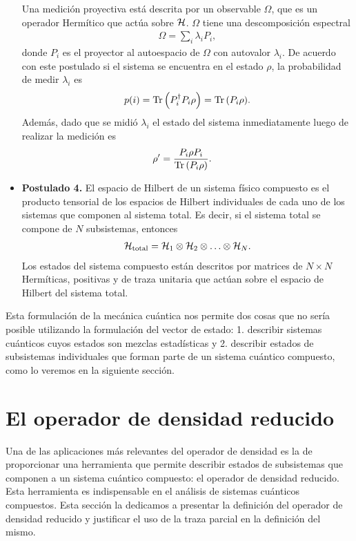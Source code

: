 \begin{itemize}
	Una medición proyectiva está descrita por un observable
	$\Omega$, que es un operador Hermítico que actúa sobre $\mathcal{H}$. 
	$\Omega$ tiene una descomposición espectral \cite{nielsen_chuang_2011}
	\begin{align}
		\Omega = \sum _i \lambda_iP_i,
	\end{align}
	donde $P_i$ es el proyector al autoespacio de $\Omega$ 
	con autovalor $\lambda_i$.
	De acuerdo con este postulado si el sistema se encuentra en el estado
	$\rho$, la probabilidad de medir $\lambda_i$ es
	\begin{align}
		p(i) = \Tr \qty(P_i^{\dagger}P_i\rho) = \Tr \qty(P_i\rho).
	\end{align}
	Además, dado que se midió $\lambda_i$ el estado del sistema inmediatamente 
	luego de realizar la medición es 
	\begin{align}
		\rho'&=\frac{P_i\rho P_i}{\Tr \qty(P_i \rho)}.
	\end{align}
	\item[] \textbf{Postulado 4.} El espacio de Hilbert de un sistema físico 
	compuesto es el producto tensorial de los espacios de Hilbert 
	individuales de cada uno de los sistemas que componen al sistema total.
	Es decir, si el sistema total se compone de $N$ subsistemas, entonces
	\begin{align}
		\mathcal{H}_{\text{total}} = \mathcal{H}_1\otimes \mathcal{H}_2 \otimes \ldots \otimes \mathcal{H}_N.
	\end{align}
	Los estados del sistema compuesto están descritos por matrices de 
$N\times N$ Hermíticas, positivas y de traza unitaria que actúan 
sobre el espacio de Hilbert del sistema total.
\end{itemize}

Esta formulación de la mecánica cuántica nos permite 
dos cosas que no sería posible utilizando la formulación del 
vector de estado:
1. describir sistemas cuánticos cuyos estados son mezclas estadísticas y
2. describir estados de subsistemas individuales que forman parte de 
un sistema cuántico compuesto, como lo veremos
en la siguiente sección. 

\section{El operador de densidad reducido} %
Una de las aplicaciones más relevantes del operador de densidad es  
la de proporcionar una herramienta que permite
describir estados de subsistemas que componen a un sistema
cuántico compuesto: el operador de
densidad reducido. Esta herramienta es indispensable en el 
análisis de sistemas cuánticos compuestos. Esta sección la 
dedicamos a presentar la definición del operador de densidad reducido
y justificar el uso de la traza parcial en la definición del mismo.


